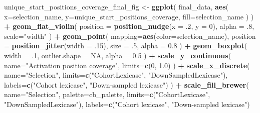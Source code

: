 \documentclass[]{book}
\newenvironment{Shaded}{\begin{snugshade}}{\end{snugshade}}
\newcommand{\DataTypeTok}[1]{\textcolor[rgb]{0.13,0.29,0.53}{#1}}
\newcommand{\DecValTok}[1]{\textcolor[rgb]{0.00,0.00,0.81}{#1}}
\newcommand{\FloatTok}[1]{\textcolor[rgb]{0.00,0.00,0.81}{#1}}
\newcommand{\KeywordTok}[1]{\textcolor[rgb]{0.13,0.29,0.53}{\textbf{#1}}}
\newcommand{\NormalTok}[1]{#1}
\newcommand{\OperatorTok}[1]{\textcolor[rgb]{0.81,0.36,0.00}{\textbf{#1}}}
\newcommand{\OtherTok}[1]{\textcolor[rgb]{0.56,0.35,0.01}{#1}}
\newcommand{\StringTok}[1]{\textcolor[rgb]{0.31,0.60,0.02}{#1}}
\begin{document}
\begin{Shaded}
\begin{Highlighting}[]
\NormalTok{unique_start_positions_coverage_final_fig <-}\StringTok{ }\KeywordTok{ggplot}\NormalTok{(}
\NormalTok{    final_data,}
    \KeywordTok{aes}\NormalTok{(}
      \DataTypeTok{x=}\NormalTok{selection_name,}
      \DataTypeTok{y=}\NormalTok{unique_start_positions_coverage,}
      \DataTypeTok{fill=}\NormalTok{selection_name}
\NormalTok{    )}
\NormalTok{  ) }\OperatorTok{+}
\StringTok{  }\KeywordTok{geom_flat_violin}\NormalTok{(}
    \DataTypeTok{position =} \KeywordTok{position_nudge}\NormalTok{(}\DataTypeTok{x =} \FloatTok{.2}\NormalTok{, }\DataTypeTok{y =} \DecValTok{0}\NormalTok{),}
    \DataTypeTok{alpha =} \FloatTok{.8}\NormalTok{,}
    \DataTypeTok{scale=}\StringTok{"width"}
\NormalTok{  ) }\OperatorTok{+}
\StringTok{  }\KeywordTok{geom_point}\NormalTok{(}
    \DataTypeTok{mapping=}\KeywordTok{aes}\NormalTok{(}\DataTypeTok{color=}\NormalTok{selection_name),}
    \DataTypeTok{position =} \KeywordTok{position_jitter}\NormalTok{(}\DataTypeTok{width =} \FloatTok{.15}\NormalTok{),}
    \DataTypeTok{size =} \FloatTok{.5}\NormalTok{,}
    \DataTypeTok{alpha =} \FloatTok{0.8}
\NormalTok{  ) }\OperatorTok{+}
\StringTok{  }\KeywordTok{geom_boxplot}\NormalTok{(}
    \DataTypeTok{width =} \FloatTok{.1}\NormalTok{,}
    \DataTypeTok{outlier.shape =} \OtherTok{NA}\NormalTok{,}
    \DataTypeTok{alpha =} \FloatTok{0.5}
\NormalTok{  ) }\OperatorTok{+}
\StringTok{  }\KeywordTok{scale_y_continuous}\NormalTok{(}
    \DataTypeTok{name=}\StringTok{"Activation position coverage"}\NormalTok{,}
    \DataTypeTok{limits=}\KeywordTok{c}\NormalTok{(}\DecValTok{0}\NormalTok{, }\FloatTok{1.0}\NormalTok{)}
\NormalTok{  ) }\OperatorTok{+}
\StringTok{  }\KeywordTok{scale_x_discrete}\NormalTok{(}
    \DataTypeTok{name=}\StringTok{"Selection"}\NormalTok{,}
    \DataTypeTok{limits=}\KeywordTok{c}\NormalTok{(}\StringTok{"CohortLexicase"}\NormalTok{, }\StringTok{"DownSampledLexicase"}\NormalTok{),}
    \DataTypeTok{labels=}\KeywordTok{c}\NormalTok{(}\StringTok{"Cohort lexicase"}\NormalTok{, }\StringTok{"Down-sampled lexicase"}\NormalTok{)}
\NormalTok{  ) }\OperatorTok{+}
\StringTok{  }\KeywordTok{scale_fill_brewer}\NormalTok{(}
    \DataTypeTok{name=}\StringTok{"Selection"}\NormalTok{,}
    \DataTypeTok{palette=}\NormalTok{cb_palette,}
    \DataTypeTok{limits=}\KeywordTok{c}\NormalTok{(}\StringTok{"CohortLexicase"}\NormalTok{, }\StringTok{"DownSampledLexicase"}\NormalTok{),}
    \DataTypeTok{labels=}\KeywordTok{c}\NormalTok{(}\StringTok{"Cohort lexicase"}\NormalTok{, }\StringTok{"Down-sampled lexicase"}\NormalTok{)}

\end{Highlighting}
\end{Shaded}
\end{document}
